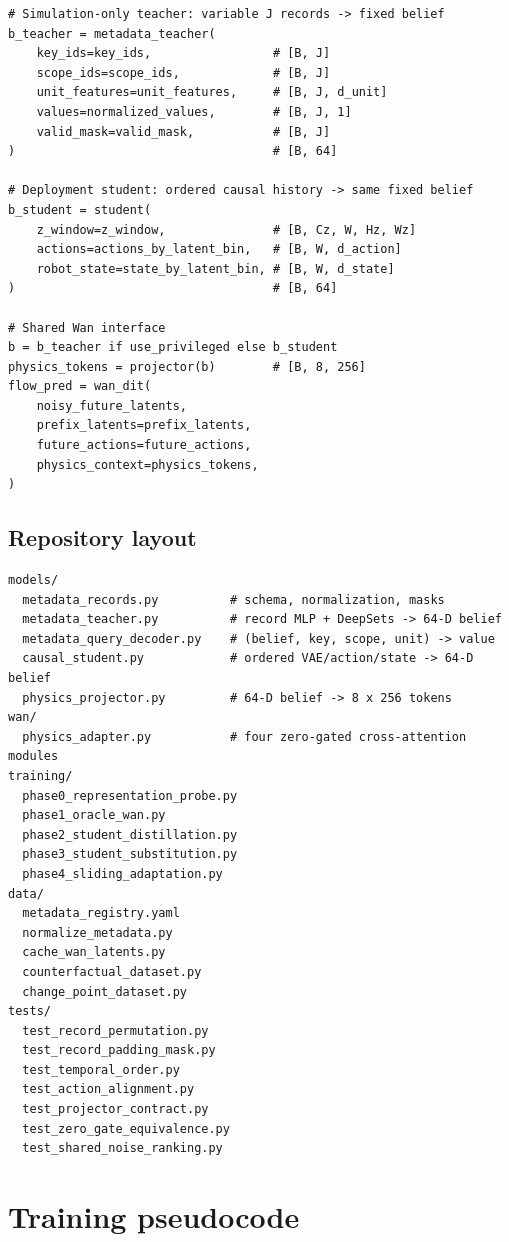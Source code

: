 \documentclass[11pt]{article}
\begin{document}
\begin{lstlisting}[style=pythonstyle]
# Simulation-only teacher: variable J records -> fixed belief
b_teacher = metadata_teacher(
    key_ids=key_ids,                 # [B, J]
    scope_ids=scope_ids,             # [B, J]
    unit_features=unit_features,     # [B, J, d_unit]
    values=normalized_values,        # [B, J, 1]
    valid_mask=valid_mask,           # [B, J]
)                                    # [B, 64]

# Deployment student: ordered causal history -> same fixed belief
b_student = student(
    z_window=z_window,               # [B, Cz, W, Hz, Wz]
    actions=actions_by_latent_bin,   # [B, W, d_action]
    robot_state=state_by_latent_bin, # [B, W, d_state]
)                                    # [B, 64]

# Shared Wan interface
b = b_teacher if use_privileged else b_student
physics_tokens = projector(b)        # [B, 8, 256]
flow_pred = wan_dit(
    noisy_future_latents,
    prefix_latents=prefix_latents,
    future_actions=future_actions,
    physics_context=physics_tokens,
)
\end{lstlisting}

\subsection{Repository layout}

\begin{lstlisting}[style=pythonstyle]
models/
  metadata_records.py          # schema, normalization, masks
  metadata_teacher.py          # record MLP + DeepSets -> 64-D belief
  metadata_query_decoder.py    # (belief, key, scope, unit) -> value
  causal_student.py            # ordered VAE/action/state -> 64-D belief
  physics_projector.py         # 64-D belief -> 8 x 256 tokens
wan/
  physics_adapter.py           # four zero-gated cross-attention modules
training/
  phase0_representation_probe.py
  phase1_oracle_wan.py
  phase2_student_distillation.py
  phase3_student_substitution.py
  phase4_sliding_adaptation.py
data/
  metadata_registry.yaml
  normalize_metadata.py
  cache_wan_latents.py
  counterfactual_dataset.py
  change_point_dataset.py
tests/
  test_record_permutation.py
  test_record_padding_mask.py
  test_temporal_order.py
  test_action_alignment.py
  test_projector_contract.py
  test_zero_gate_equivalence.py
  test_shared_noise_ranking.py
\end{lstlisting}

\section{Training pseudocode}
\end{document}
